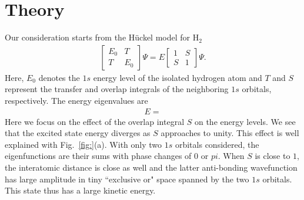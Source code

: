 \documentclass[twocolumn,showpacs,prb,amsfonts,amsmath,amssymb,floatfix,groupedaddress]{revtex4-1}
\begin{document}
\section{Theory}
Our consideration starts from the H\"{u}ckel model for H$_{2}$
\begin{eqnarray}
\left[
\begin{array}{cc}
E_{0} & T \\
T & E_{0}
\end{array}
\right]
\Psi
=
E
\left[
\begin{array}{cc}
1 & S \\
S & 1
\end{array}
\right]
\Psi
.
\end{eqnarray}
Here, $E_{0}$ denotes the $1s$ energy level of the isolated hydrogen atom and $T$ and $S$ represent the transfer and overlap integrals of the neighboring $1s$ orbitals, respectively. The energy eigenvalues are
\begin{eqnarray}
E
=
\end{eqnarray}
Here we focus on the effect of the overlap integral $S$ on the energy levels. We see that the excited state energy diverges as $S$ approaches to unity. This effect is well explained with Fig.~\ref{fig:}(a). With only two $1s$ orbitals considered, the eigenfunctions are their sums with phase changes of $0$ or $pi$. When $S$ is close to $1$, the interatomic distance is close as well and the latter anti-bonding wavefunction has large amplitude in tiny ``exclusive or" space spanned by the two $1s$ orbitals. This state thus has a large kinetic energy. 
\end{document}
